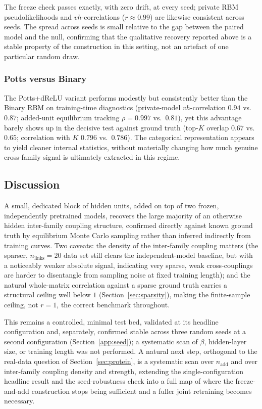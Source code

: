 \documentclass[11pt]{article}
\begin{document}
The freeze check passes exactly, with zero drift, at every seed; private
RBM pseudolikelihoods and $vh$-correlations ($r\approx0.99$) are likewise
consistent across seeds. The spread across seeds is small relative to the
gap between the paired model and the null, confirming that the qualitative
recovery reported above is a stable property of the construction in this
setting, not an artefact of one particular random draw.

\subsubsection{Potts versus Binary}

The Potts+dReLU variant performs modestly but consistently better than
the Binary RBM on training-time diagnostics (private-model $vh$-correlation
$0.94$ vs.\ $0.87$; added-unit equilibrium tracking $\rho=0.997$ vs.\
$0.81$), yet this advantage barely shows up in the decisive test against
ground truth (top-$K$ overlap $0.67$ vs.\ $0.65$; correlation with $K$
$0.796$ vs.\ $0.786$). The categorical representation appears to yield
cleaner internal statistics, without materially changing how much genuine
cross-family signal is ultimately extracted in this regime.

\subsection{Discussion}

A small, dedicated block of hidden units, added on top of two frozen,
independently pretrained models, recovers the large majority of an
otherwise hidden inter-family coupling structure, confirmed directly
against known ground truth by equilibrium Monte Carlo sampling rather
than inferred indirectly from training curves. Two caveats: the density
of the inter-family coupling matters (the sparser, $n_{\mathrm{links}}=20$
data set still clears the independent-model baseline, but with a
noticeably weaker absolute signal, indicating very sparse, weak
cross-couplings are harder to disentangle from sampling noise at fixed
training length); and the natural whole-matrix correlation against a
sparse ground truth carries a structural ceiling well below $1$
(Section~\ref{sec:sparsity}), making the finite-sample ceiling, not
$r=1$, the correct benchmark throughout.

This remains a controlled, minimal test bed, validated at its headline
configuration and, separately, confirmed stable across three random seeds
at a second configuration (Section~\ref{app:seed}); a systematic scan of
$\beta$, hidden-layer size, or training length was not performed. A
natural next step, orthogonal to the real-data question of
Section~\ref{sec:protein}, is a systematic scan over $n_{\mathrm{add}}$
and over inter-family coupling density and strength, extending the
single-configuration headline result and the seed-robustness check into a
full map of where the freeze-and-add construction stops being sufficient
and a fuller joint retraining becomes necessary.
\end{document}
